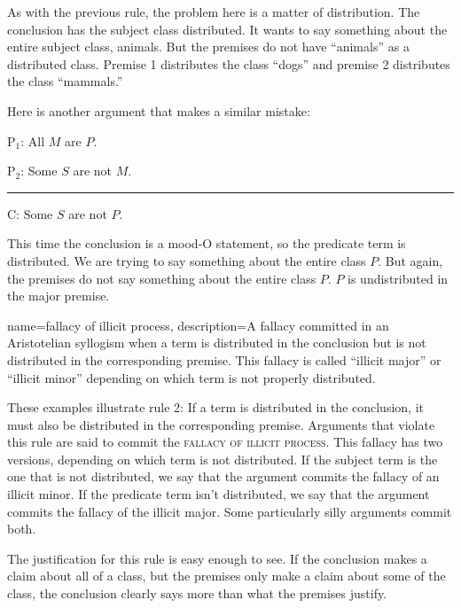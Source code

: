 As with the previous rule, the problem here is a matter of distribution. The conclusion has the subject class distributed. It wants to say something about the entire subject class, animals. But the premises do not have ``animals'' as a distributed class. Premise 1 distributes the class ``dogs'' and premise 2 distributes the class ``mammals.'' 

Here is another argument that makes a similar mistake:

\begin{earg}
\item[P$_1$:] All $M$ are $P$.
\item[P$_2$:] Some $S$ are not $M$.
\vspace{-.5em}
\item [] \rule{0.2\linewidth}{.5pt} 
\item[C:] Some $S$ are not $P$.
\end{earg}

This time the conclusion is a mood-O statement, so the predicate term is distributed. We are trying to say something about the entire class $P$. But again, the premises do not say something about the entire class $P$. $P$ is undistributed in the major premise. 

{
name=fallacy of illicit process,
description={A fallacy committed in an Aristotelian syllogism when a term is distributed in the conclusion but is not distributed in the corresponding premise. This fallacy is called ``illicit major'' or ``illicit minor'' depending on which term is not properly distributed. }
}


These examples illustrate rule 2: If a term is distributed in the conclusion, it must also be distributed in the corresponding premise. Arguments that violate this rule are said to commit the \textsc{\gls{fallacy of illicit process}}. \label{def:illicit_process} This fallacy has two versions, depending on which term is not distributed. If the subject term is the one that is not distributed, we say that the argument commits the fallacy of an illicit minor. If the predicate term isn't distributed, we say that the argument commits the fallacy of the illicit major. Some particularly silly arguments commit both.

The justification for this rule is easy enough to see. If the conclusion makes a claim about all of a class, but the premises only make a claim about some of the class, the conclusion clearly says more than what the premises justify. 

